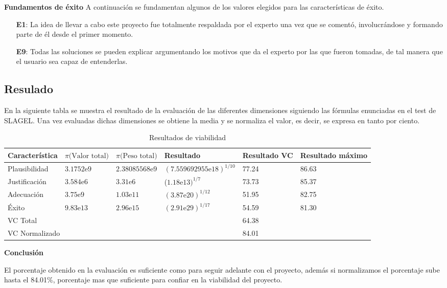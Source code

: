\textbf{Fundamentos de éxito}
A continuación se fundamentan algunos de los valores elegidos para las características de éxito.

\begin{enumerate}
  \item[\textbf{E1}:] La idea de llevar a cabo este proyecto fue totalmente respaldada
     por el experto una vez que se comentó, involucrándose y formando parte de él desde
     el primer momento.
  \item[\textbf{E9}:] Todas las soluciones se pueden explicar argumentando los motivos
     que da el experto por las que fueron tomadas, de tal manera que el usuario sea
     capaz de entenderlas.
\end{enumerate}

\subsection{Resulado}

En la siguiente tabla se muestra el resultado de la evaluación de las diferentes dimensiones
 siguiendo las fórmulas enunciadas en el test de SLAGEL. Una vez evaluadas dichas dimensiones
 se obtiene la media y se normaliza el valor, es decir, se expresa en tanto por ciento.

\begin{table}[htb]%
  \centering
  \caption{Resultados de viabilidad}
  \label{tab:anchura}
  \begin{tabular}{ | l | l | l | l | p{1.5cm} | p{1.5cm} | }
    \hline
    Característica & $\pi\text{(Valor total)}$ & $\pi\text{(Peso total)}$ & Resultado & Resultado VC & Resultado máximo \\ \hline \hline
    Plausibilidad & $3.1752\text{e}9$ & $2.38085568\text{e}9$ & $(7.559692955\text{e}18)^{1/10}$ & 77.24 & 86.63 \\ \hline
    Justificación & $3.584\text{e}6$  & $3.31\text{e}6$ & ($1.18\text{e}13)^{1/7}$ & 73.73 & 85.37 \\ \hline
    Adecuación & $3.75\text{e}9$ & $1.03\text{e}11$ & $(3.87\text{e}20)^{1/12}$ & 51.95 & 82.75 \\ \hline
    Éxito & $9.83\text{e}13$ & $2.96\text{e}15$ & $(2.91\text{e}29)^{1/17}$ & 54.59 & 81.30 \\ \hline \hline
    \multicolumn{4}{|l|}{VC Total} & \multicolumn{2}{l|}{64.38} \\ \hline
    \multicolumn{4}{|l|}{VC Normalizado} & \multicolumn{2}{l|}{84.01} \\ \hline

  \end{tabular}
\end{table}

\textbf{Conclusión}

El porcentaje obtenido en la evaluación es suficiente como para seguir adelante
 con el proyecto, además si normalizamos el porcentaje sube hasta el 84.01\%, porcentaje
 mas que suficiente para confiar en la viabilidad del proyecto.

